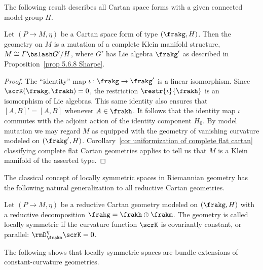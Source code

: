 The following result describes all Cartan space forms with a given connected model group $H$.

\begin{thm}\label{thm uniformization of cartan space forms}
    Let $(P\to M,\eta)$ be a Cartan space form of type $(\frakg,H)$. 
    Then the geometry on $M$ is a mutation of a complete Klein manifold structure, $M\cong \varGamma \bslash G'\slash H$, where $G'$ has Lie algebra $\frakg'$ as described in Proposition~\ref{prop 5.6.8 Sharpe}.
\end{thm}
\begin{proof}
    The ``identity'' map $\iota:\frakg\to \frakg'$ is a linear isomorphism. Since $\scrK(\frakg,\frakh)=0$, the restriction $\restr{\iota}{\frakh}$ is an isomorphism of Lie algebras. This same identity also ensures that $[A,B]'=[A,B]$ whenever $A\in \frakh$. It follows that the identity map $\iota$ commutes with the adjoint action of the identity component $H_0$. By model mutation we may regard $M$ as equipped with the geometry of vanishing curvature modeled on $(\frakg',H)$. Corollary~\ref{cor uniformization of complete flat cartan} classifying complete flat Cartan geometries applies to tell us that $M$ is a Klein manifold of the asserted type.
\end{proof}

The classical concept of locally symmetric spaces in Riemannian geometry has the following natural generalization to all reductive Cartan geometries.

\begin{defn}
    Let $(P\to M,\eta)$ be a reductive Cartan geometry modeled on $(\frakg,H)$ with a reductive decomposition $\frakg=\frakh\oplus\frakm$. The geometry is called locally symmetric if the curvature function $\scrK$ is covariantly constant, or parallel: $\rmD^\eta_\frakm \scrK=0$.
\end{defn}

The following shows that locally symmetric spaces are bundle extensions of constant-curvature geometries.

